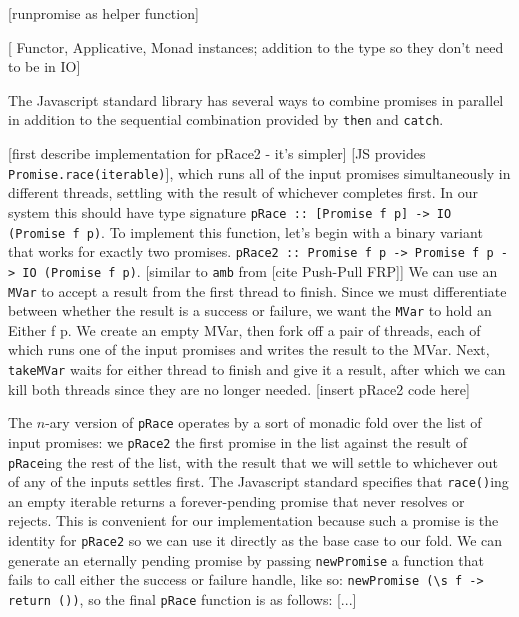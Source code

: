 \documentclass[sigplan,screen]{acmart}
\newcommand{\lit}[1]{\lstinline{#1}}
\begin{document}
[runpromise as helper function]

[ Functor, Applicative, Monad instances; addition to the type so they don't need to be in IO]

The Javascript standard library has several ways to combine promises in parallel in addition to the sequential combination provided by \lit{then} and \lit{catch}.

[first describe implementation for pRace2 - it's simpler]
[JS provides \lit{Promise.race(iterable)}], which runs all of the input promises simultaneously in different threads, settling with the result of whichever completes first.  In our system this should have type signature \lit{pRace :: [Promise f p] -> IO (Promise f p)}.  To implement this function, let's begin with a binary variant that works for exactly two promises.  \lit{pRace2 :: Promise f p -> Promise f p -> IO (Promise f p)}.  [similar to \lit {amb} from [cite Push-Pull FRP]]  We can use an \lit{MVar} to accept a result from the first thread to finish.  Since we must differentiate between whether the result is a success or failure, we want the \lit{MVar} to hold an {Either f p}.  We create an empty MVar, then fork off a pair of threads, each of which runs one of the input promises and writes the result to the MVar.  Next, \lit{takeMVar} waits for either thread to finish and give it a result, after which we can kill both threads since they are no longer needed.
[insert pRace2 code here]

The \(n\)-ary version of \lit{pRace} operates by a sort of monadic fold over the list of input promises: we \lit{pRace2} the first promise in the list against the result of \lit{pRace}ing the rest of the list, with the result that we will settle to whichever out of any of the inputs settles first.  The Javascript standard specifies that \lit{race()}ing an empty iterable returns a forever-pending promise that never resolves or rejects.  This is convenient for our implementation because such a promise is the identity for \lit{pRace2} so we can use it directly as the base case to our fold.  We can generate an eternally pending promise by passing \lit{newPromise} a function that fails to call either the success or failure handle, like so: \verb|newPromise (\s f -> return ())|, so the final \lit{pRace} function is as follows:
[...]
\end{document}
